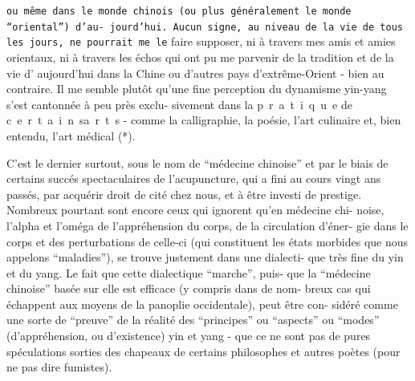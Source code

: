 \texttt{ou même dans le monde chinois (ou plus généralement le monde ``oriental'') d'au-
jourd'hui. Aucun signe, au niveau de la vie de tous les jours, ne pourrait me le}
faire supposer, ni à travers mes amis et amies orientaux, ni à travers les échos
qui ont pu me parvenir de la tradition et de la vie d' aujourd'hui dans la
Chine ou d'autres pays d'extrême-Orient - bien au contraire. Il me semble plutôt
qu'une fine perception du dynamisme yin-yang s'est cantonnée à peu près exclu-
sivement dans la \mbox{p r a t i q u e} de \mbox{c e r t a i n s\quad a r t s} - comme
la calligraphie, la poésie, l'art culinaire et, bien entendu, l'art médical (*).

C'est le dernier surtout, sous le nom de ``médecine chinoise'' et par le
biais de certains succés spectaculaires de l'acupuncture, qui a fini au cours 
vingt ans passés, par acquérir droit de cité chez nous, et à être investi de
prestige. Nombreux pourtant sont encore ceux qui ignorent qu'en médecine chi-
noise, l'alpha et l'oméga de l'appréhension du corps, de la circulation d'éner-
gie dans le corps et des perturbations de celle-ci (qui constituent les états
morbides que nous appelons ``maladies''), se trouve justement dans une dialecti-
que très fine du yin et du yang. Le fait que cette dialectique ``marche'', puis-
que la ``médecine chinoise'' basée sur elle est efficace (y compris dans de nom-
breux cas qui échappent aux moyens de la panoplie occidentale), peut être con-
sidéré comme une sorte de ``preuve'' de la réalité des ``principes'' ou ``aspects''
ou ``modes'' (d'appréhension, ou d'existence) yin et yang - que ce ne sont pas
de pures spéculations sorties des chapeaux de certains philosophes et autres
poètes (pour ne pas dire fumistes).

